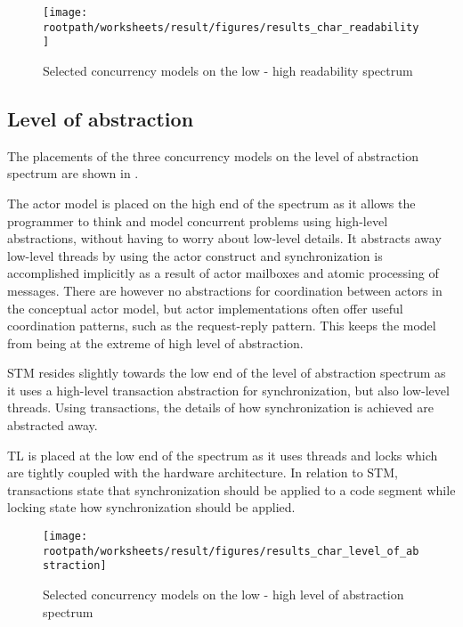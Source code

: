 \begin{figure}[htbp]
\centering
 \texttt{[image: \\rootpath/worksheets/result/figures/results\_char\_readability]} 
 \caption{Selected concurrency models on the low - high readability spectrum}
\label{fig:results_char_readability}
\end{figure}

\subsection{Level of abstraction}
The placements of the three concurrency models on the level of abstraction spectrum are shown in .

The actor model is placed on the high end of the spectrum as it allows the programmer to think and model concurrent problems using high-level abstractions, without having to worry about low-level details. It abstracts away low-level threads by using the actor construct and synchronization is accomplished implicitly as a result of actor mailboxes and atomic processing of messages. There are however no abstractions for coordination between actors in the conceptual actor model, but actor implementations often offer useful coordination patterns, such as the request-reply pattern. This keeps the model from being at the extreme of high level of abstraction.

\ac{STM} resides slightly towards the low end of the level of abstraction spectrum as it uses a high-level transaction abstraction for synchronization, but also low-level threads. Using transactions, the details of how synchronization is achieved are abstracted away. 

\ac{TL} is placed at the low end of the spectrum as it uses threads and locks which are tightly coupled with the hardware architecture. In relation to \ac{STM}, transactions state that synchronization should be applied to a code segment while locking state how synchronization should be applied.

\begin{figure}[htbp]
\centering
 \texttt{[image: \\rootpath/worksheets/result/figures/results\_char\_level\_of\_abstraction]} 
 \caption{Selected concurrency models on the low - high level of abstraction spectrum}
\label{fig:results_char_level_of_abstraction}
\end{figure}

